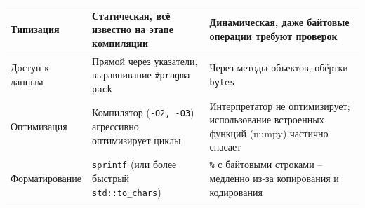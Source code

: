 \documentclass[oneside,a4paper,14pt]{extarticle} %
\begin{document}
\begin{enumerate}
\begin{table}[htbp]
\begin{tabular}{|p{4cm}|p{6cm}|p{6cm}|}
			\hline
			Типизация & Статическая, всё известно на этапе компиляции & Динамическая, даже байтовые операции требуют проверок \\
			\hline
			Доступ к данным & Прямой через указатели, выравнивание \texttt{\#pragma pack} & Через методы объектов, обёртки \texttt{bytes} \\
			\hline
			Оптимизация & Компилятор (\texttt{-O2, -O3}) агрессивно оптимизирует циклы & Интерпретатор не оптимизирует; использование встроенных функций (numpy) частично спасает \\
			\hline
			Форматирование & \texttt{sprintf} (или более быстрый \texttt{std::to\_chars}) & \texttt{\%} с байтовыми строками -- медленно из-за копирования и кодирования \\
			\hline
			\end{tabular}
		\end{table}
	\end{enumerate}
\end{document}
